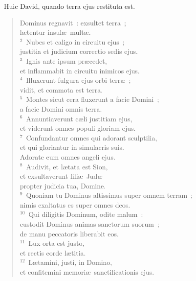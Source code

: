 ~\lettrine[lines=10,image=true,loversize=0.05,lraise=-0.03]{H}{}uic David, quando terra ejus restituta est. \begin{flushleft}\begin{verse}\vspace{6pt}Dominus regnavit~: exsultet terra~;\\ l\ae tentur insul\ae\ mult\ae .\\
${}^{2}$~Nubes et caligo in circuitu ejus~;\\ justitia et judicium correctio sedis ejus.\\
${}^{3}$~Ignis ante ipsum pr\ae cedet,\\ et inflammabit in circuitu inimicos ejus.\\
${}^{4}$~Illuxerunt fulgura ejus orbi terr\ae~;\\ vidit, et commota est terra.\\
${}^{5}$~Montes sicut cera fluxerunt a facie Domini~;\\ a facie Domini omnis terra.\\
${}^{6}$~Annuntiaverunt c\ae li justitiam ejus,\\ et viderunt omnes populi gloriam ejus.\\
${}^{7}$~Confundantur omnes qui adorant sculptilia,\\ et qui gloriantur in simulacris suis.\\ Adorate eum omnes angeli ejus.\\
${}^{8}$~Audivit, et l\ae tata est Sion,\\ et exsultaverunt fili\ae\ Jud\ae \\ propter judicia tua, Domine.\\
${}^{9}$~Quoniam tu Dominus altissimus super omnem terram~;\\ nimis exaltatus es super omnes deos.\\
${}^{10}$~Qui diligitis Dominum, odite malum~:\\ custodit Dominus animas sanctorum suorum~;\\ de manu peccatoris liberabit eos.\\
${}^{11}$~Lux orta est justo,\\ et rectis corde l\ae titia.\\
${}^{12}$~L\ae tamini, justi, in Domino,\\ et confitemini memori\ae\ sanctificationis ejus.\end{verse}\end{flushleft}


